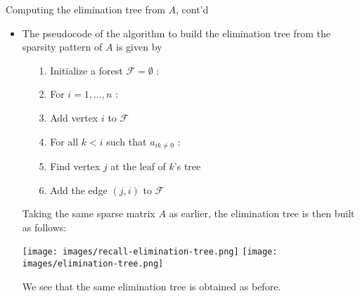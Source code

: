 \documentclass[t,usepdftitle=false]{beamer}
\begin{document}
\begin{frame}{Computing the elimination tree from $A$, cont'd}
\begin{itemize}
\item The pseudocode of the algorithm to build the elimination tree from the sparsity pattern of $A$ is given by
\vspace{.1cm}
\begin{itemize}
\item[1.] Initialize a forest $\mathcal{F}=\emptyset$ :\vspace{.1cm}
\item[2.] For $i=1,\dots,n$ :\vspace{.1cm}
\item[3.]\hspace{.4cm}Add vertex $i$ to $\mathcal{F}$\vspace{.1cm}
\item[4.]\hspace{.4cm}For all $k<i$ such that $a_{ik\neq 0}$ :\vspace{.1cm}
\item[5.]\hspace{.8cm}Find vertex $j$ at the leaf of $k$'s tree\vspace{.1cm} 
\item[6.]\hspace{.8cm}Add the edge $(j,i)$ to $\mathcal{F}$
\end{itemize}
\vspace{.15cm}
Taking the same sparse matrix $A$ as earlier, the elimination tree is then built as follows:
\begin{center}
\vspace{.1cm}
\texttt{[image: images/recall-elimination-tree.png]}
\texttt{[image: images/elimination-tree.png]}
\end{center}
We see that the same elimination tree is obtained as before.
\end{itemize}
\end{frame}
\end{document}
